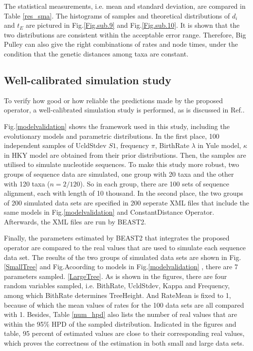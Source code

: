 \documentclass{bmcart}
\begin{document}
The statistical measurements, i.e. mean and standard deviation, are compared in Table \ref{res_sma}. The histograms of samples and theoretical distributions of ${d_i}$ and ${t_E}$ are pictured in Fig.\ref{Fig.sub.9} and Fig.\ref{Fig.sub.10}. It is shown that the two distributions are consistent within the acceptable error range. Therefore, Big Pulley can also give the right combinations of rates and node times, under the condition that the genetic distances among taxa are constant.
\subsection*{Well-calibrated simulation study}
To verify how good or how reliable the predictions made by the proposed operator, a well-calibrated simulation study is performed, as is discussed in Ref.\cite{dawid1982well}.

Fig.\ref{modelvalidation} shows the framework used in this study, including the evolutionary models and parametric distributions. In the first place, 100 independent samples of UcldStdev $S1$, frequency $\pi$, BirthRate $\lambda $ in Yule model, $\kappa$ in HKY model are obtained from their prior distributions. Then, the samples are utilised to simulate nucleotide sequences. To make this study more robust, two groups of sequence data are simulated, one group with 20 taxa and the other with 120 taxa ($n=2/120$). So in each group, there are 100 sets of sequence alignment, each with length of 10 thousand. 
In the second place, the two groups of 200 simulated data sets are specified in 200 seperate XML files that include the same models in Fig.\ref{modelvalidation} and ConstantDistance Operator. Afterwards, the XML files are run by BEAST2. 

Finally, the parameters estimated by BEAST2 that integrates the proposed operator are compared to the real values that are used to simulate each sequence data set. The results of the two groups of simulated data sets are shown in Fig.\ref{SmallTree} and Fig.Acoording to models in Fig.\ref{modelvalidation} , there are 7 parameters sampled. 
\ref{LargeTree}. As is shown in the figures, there are four random variables sampled, i.e. BithRate, UcldStdev, Kappa and Frequency, among which BithRate determines TreeHeight. And RateMean is fixed to 1, because of which the mean values of rates for the 100 data sets are all compared with 1. Besides, Table \ref{num_hpd} also lists the number of real values that are within the 95\% HPD of the sampled distribution. Indicated in the figures and table, 95 percent of estimated values are close to their corresponding real values, which proves the correctness of the estimation in both small and large data sets.
\end{document}
